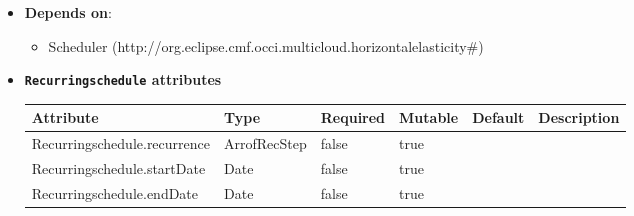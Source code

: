 \begin{itemize}
\item \textbf{Depends on}:
\begin{itemize}
	\item Scheduler (http://org.eclipse.cmf.occi.multicloud.horizontalelasticity\#)
\end{itemize}
\end{itemize}

\begin{itemize}
\item \textbf{\texttt{Recurringschedule} attributes}

\begin{tabularx}{\textwidth}{|l|l|p{1.4cm}|p{1.3cm}|l|X|}
  \hline
  \textbf{Attribute} & \textbf{Type} & \textbf{Required} & \textbf{Mutable} & \textbf{Default} & \textbf{Description} \\
  \hline  
  Recurringschedule.recurrence & ArrofRecStep & false & true &  &  \\
  \hline
  Recurringschedule.startDate & Date & false & true &  &  \\
  \hline
  Recurringschedule.endDate & Date & false & true &  &  \\
  \hline
\end{tabularx}
\end{itemize}


 
